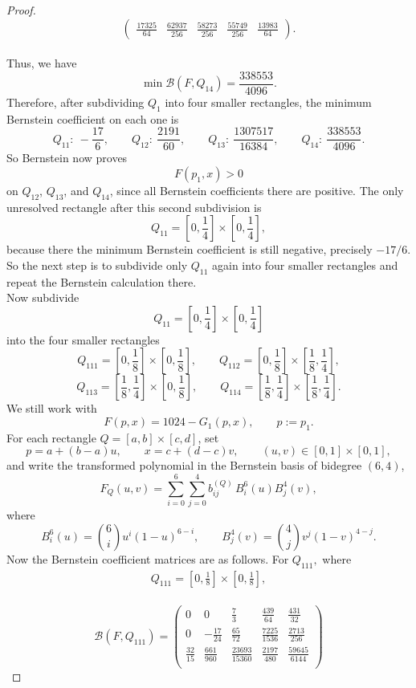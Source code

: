 \documentclass[10pt,a4paper]{amsart}
\begin{document}
\begin{proof}
\[\begin{pmatrix}
	\frac{17325}{64} & \frac{62937}{256} & \frac{58273}{256} & \frac{55749}{256} & \frac{13983}{64}
\end{pmatrix}.
\]\\
Thus, we have 
\[
\min \mathcal B(F,Q_{14})=\frac{338553}{4096}.
\]
Therefore, after subdividing \(Q_1\) into four smaller rectangles, the minimum Bernstein coefficient on each one is
\[
Q_{11}:\ -\frac{17}{6},\qquad
Q_{12}:\ \frac{2191}{60},\qquad
Q_{13}:\ \frac{1307517}{16384},\qquad
Q_{14}:\ \frac{338553}{4096}.
\]
So Bernstein now proves
\[
F(p_1,x)>0
\]
on \(Q_{12}\), \(Q_{13}\), and \(Q_{14}\), since all Bernstein coefficients there are positive.
The only unresolved rectangle after this second subdivision is
\[
Q_{11}=\left[0,\frac14\right]\times\left[0,\frac14\right],
\]
because there the minimum Bernstein coefficient is still negative, precisely
$
-{17}/{6}.
$
So the next step is to subdivide only \(Q_{11}\) again into four smaller rectangles and repeat the Bernstein calculation there.\\[2mm]
Now subdivide
\[
Q_{11}=\left[0,\frac14\right]\times\left[0,\frac14\right]
\]
into the four smaller rectangles
\[
Q_{111}=\left[0,\frac18\right]\times\left[0,\frac18\right],\qquad
Q_{112}=\left[0,\frac18\right]\times\left[\frac18,\frac14\right],
\]
\[
Q_{113}=\left[\frac18,\frac14\right]\times\left[0,\frac18\right],\qquad
Q_{114}=\left[\frac18,\frac14\right]\times\left[\frac18,\frac14\right].
\]
We still work with
\[
F(p,x)=1024-G_1(p,x),\qquad p:=p_1.
\]
For each rectangle \(Q=[a,b]\times[c,d]\), set
\[
p=a+(b-a)u,\qquad x=c+(d-c)v,\qquad (u,v)\in[0,1]\times[0, 1],
\]
and write the transformed polynomial in the Bernstein basis of bidegree \((6,4)\),
\[
F_Q(u,v)=\sum_{i=0}^{6}\sum_{j=0}^{4} b_{ij}^{(Q)}\,B_i^6(u)B_j^4(v),
\]
where
\[
B_i^6(u)=\binom{6}{i}u^i(1-u)^{6-i},
\qquad
B_j^4(v)=\binom{4}{j}v^j(1-v)^{4-j}.
\]
Now the Bernstein coefficient matrices are as follows.
For $Q_{111},$ where
\begin{align*}
	Q_{111}=\left[0,\frac18\right]\times\left[0,\frac18\right],
\end{align*}\\
\[
\mathcal B(F,Q_{111})=
\begin{pmatrix}
	0 & 0 & \frac{7}{3} & \frac{439}{64} & \frac{431}{32}\\[5mm]
	0 & -\frac{17}{24} & \frac{65}{72} & \frac{7225}{1536} & \frac{2713}{256}\\[5mm]
	\frac{32}{15} & \frac{661}{960} & \frac{23693}{15360} & \frac{2197}{480} & \frac{59645}{6144}\\[5mm]

\end{pmatrix}\]
\end{proof}
\end{document}
